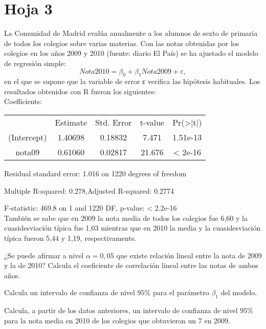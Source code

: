 


\newpage
\section{Hoja 3}
\begin{problem}[1] La Comunidad de Madrid evalúa anualmente a los alumnos de sexto de primaria de todos los colegios sobre varias materias. Con las notas obtenidas por los colegios en los años 2009 y 2010 (fuente: diario El País) se ha ajustado el modelo de regresión simple:
\[Nota2010 = β_0 + β_1Nota2009 + ε,\]
en el que se supone que la variable de error ε verifica las hipótesis habituales. Los resultados
obtenidos con R fueron los siguientes:\\[1em]

Coefficients:

\begin{tabular}{c | c | c | c | c}
	~ & Estimate & Std. Error & t-value & Pr(>|t|) \\
	(Intercept) & 1.40698 & 0.18832 & 7.471 & 1.51e-13 \\
	nota09 & 0.61060  & 0.02817 & 21.676 & < 2e-16
\end{tabular}

 Residual standard error: 1.016 on 1220 degrees of freedom

 Multiple R-squared: 0.278,Adjusted R-squared: 0.2774

 F-statistic: 469.8 on 1 and 1220 DF,  p-value: < 2.2e-16 \\[1em]

También se sabe que en 2009 la nota media de todos los colegios fue 6,60 y la cuasidesviación típica fue 1,03 mientras que en 2010 la media y la cuasidesviación típica fueron 5,44 y 1,19, respectivamente.

\ppart ¿Se puede afirmar a nivel $α = 0,05$ que existe relación lineal entre la nota de 2009 y la de 2010? Calcula el coeficiente de correlación lineal entre las notas de ambos años.

\ppart Calcula un intervalo de confianza de nivel $95\%$ para el parámetro $β_1$ del modelo.

\ppart Calcula, a partir de los datos anteriores, un intervalo de confianza de nivel $95\%$ para la nota
media en 2010 de los colegios que obtuvieron un 7 en 2009.



\end{problem}
